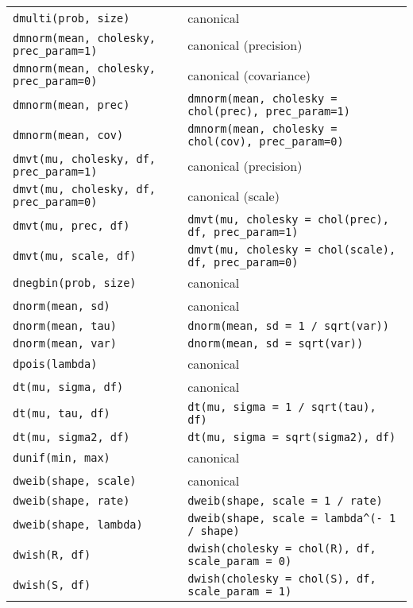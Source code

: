 \begin{center}
\begin{longtable}{ll}
     \texttt{dmulti(prob, size)} & canonical \\
     \texttt{dmnorm(mean, cholesky, prec\_param=1)} & canonical (precision) \\
     \texttt{dmnorm(mean, cholesky, prec\_param=0)} & canonical (covariance) \\
     \texttt{dmnorm(mean, prec)} & \texttt{dmnorm(mean, cholesky = chol(prec), prec\_param=1)} \\
     \texttt{dmnorm(mean, cov)} & \texttt{dmnorm(mean, cholesky = chol(cov), prec\_param=0)} \\
     \texttt{dmvt(mu, cholesky, df, prec\_param=1)} & canonical (precision) \\
     \texttt{dmvt(mu, cholesky, df, prec\_param=0)} & canonical (scale) \\
     \texttt{dmvt(mu, prec, df)} & \texttt{dmvt(mu, cholesky = chol(prec), df, prec\_param=1)} \\
     \texttt{dmvt(mu, scale, df)} & \texttt{dmvt(mu, cholesky = chol(scale), df, prec\_param=0)} \\
   \texttt{dnegbin(prob, size)} & canonical \\
     \texttt{dnorm(mean, sd)} & canonical \\
     \texttt{dnorm(mean, tau)} & \verb|dnorm(mean, sd = 1 / sqrt(var))| \\
     \texttt{dnorm(mean, var)} & \texttt{dnorm(mean, sd = sqrt(var))} \\
     \texttt{dpois(lambda)} & canonical \\
     \texttt{dt(mu, sigma, df)} & canonical \\
    \texttt{dt(mu, tau, df)} & \verb|dt(mu, sigma = 1 / sqrt(tau), df)| \\
    \texttt{dt(mu, sigma2, df)} & \verb|dt(mu, sigma = sqrt(sigma2), df)| \\
   \texttt{dunif(min, max)} & canonical \\
     \texttt{dweib(shape, scale)} & canonical \\
     \texttt{dweib(shape, rate)} & \verb|dweib(shape, scale = 1 / rate)| \\
     \texttt{dweib(shape, lambda)} & \verb|dweib(shape, scale = lambda^(- 1 / shape)| \\
     \texttt{dwish(R, df)} & \texttt{dwish(cholesky = chol(R), df, scale\_param = 0)}\\ 
     \texttt{dwish(S, df)} & \texttt{dwish(cholesky = chol(S), df, scale\_param = 1)}\\ 
     \end{longtable}
  \end{center}
